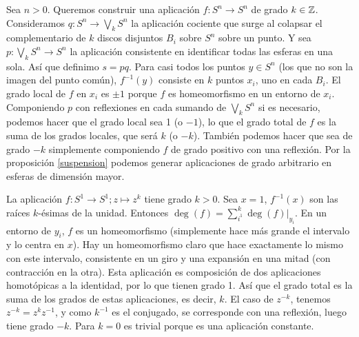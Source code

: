 \documentclass[TA.tex]{subfiles}
\begin{document}
\begin{ej}
Sea $n>0$. Queremos construir una aplicación $f:S^n\to S^n$ de grado $k\in\mathbb{Z}$. Consideramos $q:S^n\to \bigvee_k S^n$ la aplicación cociente que surge al colapsar el complementario de $k$ discos disjuntos $B_i$ sobre $S^n$ sobre un punto. Y sea $p:\bigvee_k S^n\to S^n$ la aplicación consistente en identificar todas las esferas en una sola. Así que definimo $s=pq$. Para casi todos los puntos $y\in S^n$ (los que no son la imagen del punto común), $f^{-1}(y)$ consiste en $k$ puntos $x_i$, uno en cada $B_i$. El grado local de $f$ en $x_i$ es $\pm 1$ porque $f$ es homeomorfismo en un entorno de $x_i$. Componiendo $p$ con reflexiones en cada sumando de $\bigvee_k S^n$ si es necesario, podemos hacer que el grado local sea 1 (o $-1$), lo que el grado total de $f$ es la suma de los grados locales, que será $k$ (o $-k$). También podemos hacer que sea de grado $-k$ simplemente componiendo $f$ de grado positivo con una reflexión. Por la proposición \ref{suspension} podemos generar aplicaciones de grado arbitrario en esferas de dimensión mayor. 
\end{ej}

\begin{ej}
La aplicación $f:S^1\to S^1; z\mapsto z^k$ tiene grado $k>0$. Sea $x=1$, $f^{-1}(x)$ son las raíces $k$-ésimas de la unidad. Entonces $\deg(f)=\sum_{i^1}^k\deg(f)|_{y_i}$. En un entorno de $y_i$, $f$ es un homeomorfismo (simplemente hace más grande el intervalo y lo centra en $x$). Hay un homeomorfismo claro que hace exactamente lo mismo con este intervalo, consistente en un giro y una expansión en una mitad (con contracción en la otra). Esta aplicación es composición de dos aplicaciones homotópicas a la identidad, por lo que tienen grado 1. Así que el grado total es la suma de los grados de estas aplicaciones, es decir, $k$. El caso de $z^{-k}$, tenemos $z^{-k}=z^kz^{-1}$, y como $k^{-1}$ es el conjugado, se corresponde con una reflexión, luego tiene grado $-k$. Para $k=0$ es trivial porque es una aplicación constante.  
\end{ej}
\end{document}
